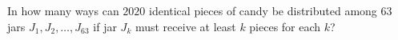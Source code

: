 In how many ways can $2020$ identical pieces of candy be distributed among $63$ jars $J_1,J_2,\dots,J_{63}$ if jar $J_k$ must receive at least $k$ pieces for each $k$?
